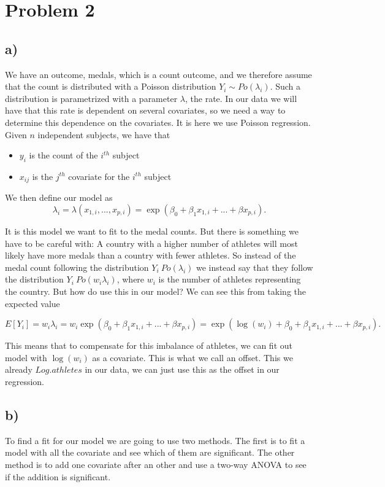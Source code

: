 \documentclass[a4paper,norsk, 10pt]{article}
\begin{document}
\section{Problem 2}
\subsection{a)}
We have an outcome, medals, which is a count outcome, and we therefore assume that the count is distributed with a Poisson distribution $Y_i \sim Po(\lambda_i)$. Such a distribution is parametrized with a parameter $\lambda$, the rate. In our data we will have that this rate is dependent on several covariates, so we need a way to determine this dependence on the covariates. It is here we use Poisson regression. Given $n$ independent subjects, we have that 
\begin{itemize}
\item $y_i$ is the count of the $i^{th}$ subject
\item $x_{ij}$ is the $j^{th}$ covariate for the $i^{th}$ subject
\end{itemize}
We then define our model as 
\begin{equation}
\lambda_i = \lambda(x_{1,i},...,x_{p,i}) = \exp(\beta_0 + \beta_1 x_{1,i} + ... + \beta x_{p,i}).
\end{equation}

It is this model we want to fit to the medal counts. But there is something we have to be careful with: A country with a higher number of athletes will most likely have more medals than a country with fewer athletes. So instead of the medal count following the distribution $Y_i ~ Po(\lambda_i)$ we instead say that they follow the distribution $Y_i ~ Po(w_i\lambda_i)$, where $w_i$ is the number of athletes representing the country. But how do use this in our model? We can see this from taking the expected value

\begin{equation}
E[Y_i] = w_i \lambda_i = w_i\exp(\beta_0 + \beta_1 x_{1,i} + ... + \beta x_{p,i}) = \exp(\log(w_i) + \beta_0 + \beta_1 x_{1,i} + ... + \beta x_{p,i}).
\end{equation}

This means that to compensate for this imbalance of athletes, we can fit out model with $\log(w_i)$ as a covariate. This is what we call an offset. This we already $Log.athletes$ in our data, we can just use this as the offset in our regression.

\subsection{b)}
To find a fit for our model we are going to use two methods. The first is to fit a model with all the covariate and see which of them are significant. The other method is to add one covariate after an other and use a two-way ANOVA to see if the addition is significant.
\end{document}
